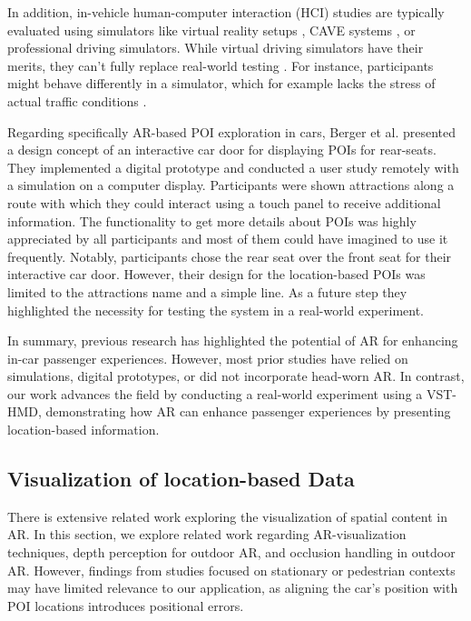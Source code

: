 In addition, in-vehicle human-computer interaction (HCI) studies are typically evaluated using simulators like virtual reality setups \cite{ColleySwiVR22}, CAVE systems \cite{SawitzkyCAVE23}, or professional driving simulators. While virtual driving simulators have their merits, they can't fully replace real-world testing \cite{petterson2019virtually}. For instance, participants might behave differently in a simulator, which for example lacks the stress of actual traffic conditions \cite{gomaa2020studying}.

Regarding specifically AR-based POI exploration in cars, Berger et al. \cite{BergerRearSeatDoor21} presented a design concept of an interactive car door for displaying POIs for rear-seats. They implemented a digital prototype and conducted a user study remotely with a simulation on a computer display. Participants were shown attractions along a route with which they could interact using a touch panel to receive additional information. The functionality to get more details about POIs was highly appreciated by all participants and most of them could have imagined to use it frequently. Notably, participants chose the rear seat over the front seat for their interactive car door.  However, their design for the location-based POIs was limited to the attractions name and a simple line. As a future step they highlighted the necessity for testing the system in a real-world experiment.

In summary, previous research has highlighted the potential of AR for enhancing in-car passenger experiences. However, most prior studies have relied on simulations, digital prototypes, or did not incorporate head-worn AR. In contrast, our work advances the field by conducting a real-world experiment using a VST-HMD, demonstrating how AR can enhance passenger experiences by presenting location-based information.




\subsection{Visualization of location-based Data}
There is extensive related work exploring the visualization of spatial content in AR. In this section, we explore related work regarding AR-visualization techniques, depth perception for outdoor AR, and occlusion handling in outdoor AR. However, findings from studies focused on stationary or pedestrian contexts may have limited relevance to our application, as aligning the car's position with POI locations introduces positional errors.

